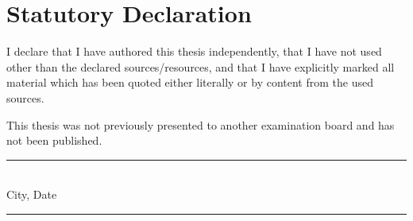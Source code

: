 \chapter*{Statutory Declaration}
I declare that I have authored this thesis independently, that I have not used
other than the declared sources/resources, and that I have explicitly marked
all material which has been quoted either literally or by content from the
used sources.

This thesis was not previously presented to another examination board and
has not been published.

\bigskip
\bigskip
\bigskip
\bigskip
	
\begin{multicols}{2}
  \raggedright
  \rule{0.25\textwidth}{0.4pt} \\
  City, Date
    
  \raggedleft
  \rule{0.25\textwidth}{0.4pt} \\
  \authorname
  
\end{multicols}

